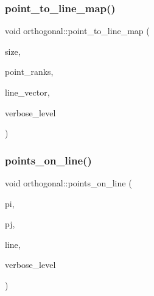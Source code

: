 \mbox{\label{classorthogonal_a1eae48671390d1c251303be93b45f9e4}} 
\subsubsection{\texorpdfstring{point\+\_\+to\+\_\+line\+\_\+map()}{point\_to\_line\_map()}}
{\footnotesize\ttfamily void orthogonal\+::point\+\_\+to\+\_\+line\+\_\+map (\begin{DoxyParamCaption}\item[{\mbox{\hyperlink{galois_8h_a09fddde158a3a20bd2dcadb609de11dc}{I\+NT}}}]{size,  }\item[{\mbox{\hyperlink{galois_8h_a09fddde158a3a20bd2dcadb609de11dc}{I\+NT}} $\ast$}]{point\+\_\+ranks,  }\item[{\mbox{\hyperlink{galois_8h_a09fddde158a3a20bd2dcadb609de11dc}{I\+NT}} $\ast$\&}]{line\+\_\+vector,  }\item[{\mbox{\hyperlink{galois_8h_a09fddde158a3a20bd2dcadb609de11dc}{I\+NT}}}]{verbose\+\_\+level }\end{DoxyParamCaption})}

\mbox{\label{classorthogonal_afe1cc564902cc557d4d4d2ff85ee6839}} 
\subsubsection{\texorpdfstring{points\+\_\+on\+\_\+line()}{points\_on\_line()}}
{\footnotesize\ttfamily void orthogonal\+::points\+\_\+on\+\_\+line (\begin{DoxyParamCaption}\item[{\mbox{\hyperlink{galois_8h_a09fddde158a3a20bd2dcadb609de11dc}{I\+NT}}}]{pi,  }\item[{\mbox{\hyperlink{galois_8h_a09fddde158a3a20bd2dcadb609de11dc}{I\+NT}}}]{pj,  }\item[{\mbox{\hyperlink{galois_8h_a09fddde158a3a20bd2dcadb609de11dc}{I\+NT}} $\ast$}]{line,  }\item[{\mbox{\hyperlink{galois_8h_a09fddde158a3a20bd2dcadb609de11dc}{I\+NT}}}]{verbose\+\_\+level }\end{DoxyParamCaption})}


